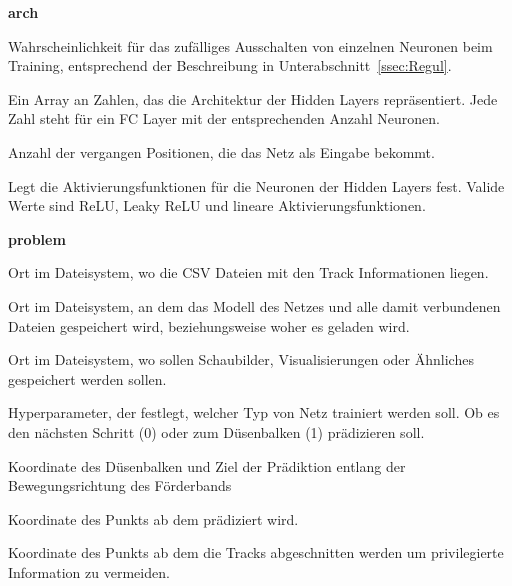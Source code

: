
\pagebreak
\bigskip
{\Large \sffamily \textbf{arch}}
\begin{description}[leftmargin=!,labelwidth=\widthof{\bfseries separatorPosition}, labelindent=0.5cm]
    \item [dropoutRate] Wahrscheinlichkeit für das zufälliges Ausschalten von einzelnen Neuronen beim Training, entsprechend der Beschreibung in Unterabschnitt~\ref{ssec:Regul}.
    \item [hiddenLayers] Ein Array an Zahlen, das die Architektur der Hidden Layers repräsentiert. Jede Zahl steht für ein FC Layer mit der entsprechenden Anzahl Neuronen.
    \item [featureSize] Anzahl der vergangen Positionen, die das Netz als Eingabe bekommt.
    \item [activation] Legt die Aktivierungsfunktionen für die Neuronen der Hidden Layers fest. Valide Werte sind ReLU, Leaky ReLU und lineare Aktivierungsfunktionen.
\end{description}

\bigskip
{\Large \sffamily \textbf{problem}}

\begin{description}[leftmargin=!,labelwidth=\widthof{\bfseries separatorPosition}, labelindent=0.5cm]
    \item[dataPath] Ort im Dateisystem, wo die CSV Dateien mit den Track Informationen liegen.
    \item[modelBasePath] Ort im Dateisystem, an dem das Modell des Netzes und alle damit verbundenen Dateien gespeichert wird, beziehungsweise woher es geladen wird. 
    \item [imagePath] Ort im Dateisystem, wo sollen Schaubilder, Visualisierungen oder Ähnliches gespeichert werden sollen.
    \item [separator] Hyperparameter, der festlegt, welcher Typ von Netz trainiert werden soll. Ob es den nächsten Schritt (0) oder zum Düsenbalken (1) prädizieren soll.
\end{description}

\begin{description}[leftmargin=!,labelwidth=\widthof{\bfseries separatorPosition}, labelindent=0.5cm]
    \item[separatorPosition] Koordinate des Düsenbalken und Ziel der Prädiktion entlang der Bewegungsrichtung des Förderbands
    \item[thresholdPoint] Koordinate des Punkts ab dem prädiziert wird.
    \item[predictionCutOff] Koordinate des Punkts ab dem die Tracks abgeschnitten werden um privilegierte Information zu vermeiden.
\end{description}

